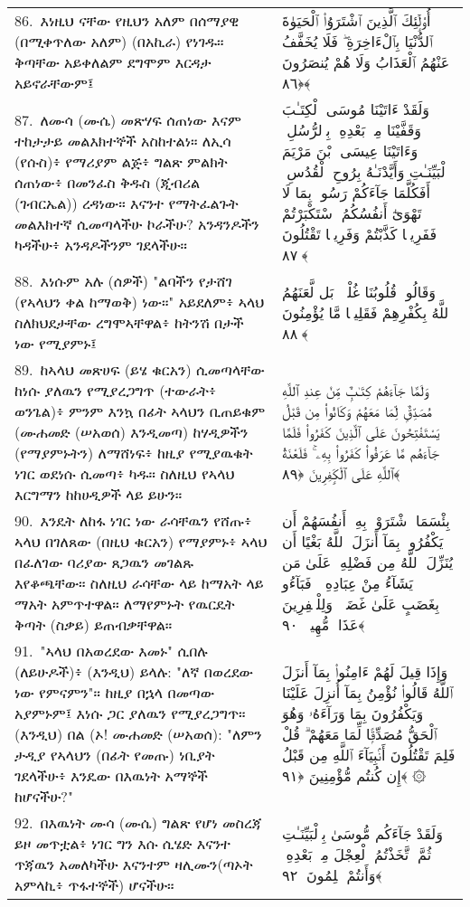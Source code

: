\documentclass[11pt,a4paper,oneside]{article}%
\newcommand{\mytextarabic}[1]{\textarabic{ #1 \flushright}}
\begin{document}
\begin{longtable}{%
  @{}
    p{}
  @{~~~}
    p{}
    @{}
}
86.\ እነዚህ ናቸው የዚህን አለም በሰማያዊ (በሚቀጥለው አለም) (በአኪራ) የነገዱ። ቅጣቸው አይቀለልም ደግሞም እርዳታ አይኖራቸውም፤ &  \mytextarabic{أُو۟لَٟٓئِكَ ٱلَّذِينَ ٱشْتَرَوُا۟ ٱلْحَيَوٰةَ ٱلدُّنْيَا بِٱلْءَاخِرَةِ ۖ فَلَا يُخَفَّفُ عَنْهُمُ ٱلْعَذَابُ وَلَا هُمْ يُنصَرُونَ ﴿٨٦﴾}\\
87.\ ለሙሳ (ሙሴ) መጽሃፍ ሰጠነው እናም ተከታታይ መልእክተኞች አስከተልነ። ለኢሳ (የሱስ)፥ የማሪያም ልጅ፥ ግልጽ ምልክት ሰጠነው፥ በመንፈስ ቅዱስ (ጂብሪል (ገብርኤል)) ረዳነው። እናንተ የማትፈልጉት መልእክተኛ ሲመጣላችሁ ኮራችሁ? አንዳንዶችን ካዳችሁ፥ አንዳዶችንም ገደላችሁ። &  \mytextarabic{وَلَقَدْ ءَاتَيْنَا مُوسَى ٱلْكِتَـٰبَ وَقَفَّيْنَا مِنۢ بَعْدِهِۦ بِٱلرُّسُلِ ۖ وَءَاتَيْنَا عِيسَى ٱبْنَ مَرْيَمَ ٱلْبَيِّنَـٰتِ وَأَيَّدْنَـٰهُ بِرُوحِ ٱلْقُدُسِ ۗ أَفَكُلَّمَا جَآءَكُمْ رَسُولٌۢ بِمَا لَا تَهْوَىٰٓ أَنفُسُكُمُ ٱسْتَكْبَرْتُمْ فَفَرِيقًۭا كَذَّبْتُمْ وَفَرِيقًۭا تَقْتُلُونَ ﴿٨٧﴾}\\
88.\ እነሱም አሉ (ሰዎች) "ልባችን የታሸገ (የኣላህን ቀል ከማወቅ) ነው።" አይደለም፥ ኣላህ ስለክህደታቸው ረግሞኣቸዋል፥ ከትንሽ በታች ነው የሚያምኑ፤ &  \mytextarabic{وَقَالُوا۟ قُلُوبُنَا غُلْفٌۢ ۚ بَل لَّعَنَهُمُ ٱللَّهُ بِكُفْرِهِمْ فَقَلِيلًۭا مَّا يُؤْمِنُونَ ﴿٨٨﴾}\\
89.\ ከኣላህ መጽሀፍ (ይሄ ቁርአን) ሲመጣላቸው ከነሱ ያለዉን የሚያረጋግጥ (ተውራት፥ ወንጌል)፥ ምንም እንኳ በፊት ኣላህን ቢጠይቁም (ሙሐመድ (ሠአወሰ) እንዲመጣ) ከሃዲዎችን (የማያምኑትን) ለማሸነፍ፥ ከዚያ የሚያዉቁት ነገር ወደነሱ ሲመጣ፥ ካዱ። ስለዚህ የኣላህ እርግማን ከከሀዲዎች ላይ ይሁን። &  \mytextarabic{وَلَمَّا جَآءَهُمْ كِتَـٰبٌۭ مِّنْ عِندِ ٱللَّهِ مُصَدِّقٌۭ لِّمَا مَعَهُمْ وَكَانُوا۟ مِن قَبْلُ يَسْتَفْتِحُونَ عَلَى ٱلَّذِينَ كَفَرُوا۟ فَلَمَّا جَآءَهُم مَّا عَرَفُوا۟ كَفَرُوا۟ بِهِۦ ۚ فَلَعْنَةُ ٱللَّهِ عَلَى ٱلْكَٟفِرِينَ ﴿٨٩﴾}\\
90.\ እንዴት ለከፋ ነገር ነው ራሳቸዉን የሸጡ፥ ኣላህ በገለጸው (በዚህ ቁርአን) የማያምኑ፥ ኣላህ በፈለገው ባሪያው ጸጋዉን መገልጹ እየቆጫቸው። ስለዚህ ራሳቸው ላይ ከማአት ላይ ማአት አምጥተዋል። ለማየምኑት የዉርዴት ቅጣት (ስቃይ) ይጠብቃቸዋል። &  \mytextarabic{ بِئْسَمَا ٱشْتَرَوْا۟ بِهِۦٓ أَنفُسَهُمْ أَن يَكْفُرُوا۟ بِمَآ أَنزَلَ ٱللَّهُ بَغْيًا أَن يُنَزِّلَ ٱللَّهُ مِن فَضْلِهِۦ عَلَىٰ مَن يَشَآءُ مِنْ عِبَادِهِۦ ۖ فَبَآءُو بِغَضَبٍ عَلَىٰ غَضَبٍۢ ۚ وَلِلْكَٟفِرِينَ عَذَابٌۭ مُّهِينٌۭ ﴿٩٠﴾}\\
91.\ "ኣላህ በአወረደው እመኑ" ሲበሉ (ለይሁዶች)፥ (እንዲህ) ይላሉ: "ለኛ በወረደው ነው የምናምን"። ከዚያ በኋላ በመጣው አያምኑም፤ እነሱ ጋር ያለዉን የሚያረጋግጥ። (እንዲህ) በል (ኦ! ሙሐመድ (ሠአወሰ): "ለምን ታዲያ  የኣላህን (በፊት የመጡ) ነቢያት   ገደላችሁ፥ እንዴው በእዉነት አማኞች ከሆናችሁ?"  &  \mytextarabic{ وَإِذَا قِيلَ لَهُمْ ءَامِنُوا۟ بِمَآ أَنزَلَ ٱللَّهُ قَالُوا۟ نُؤْمِنُ بِمَآ أُنزِلَ عَلَيْنَا وَيَكْفُرُونَ بِمَا وَرَآءَهُۥ وَهُوَ ٱلْحَقُّ مُصَدِّقًۭا لِّمَا مَعَهُمْ ۗ قُلْ فَلِمَ تَقْتُلُونَ أَنۢبِيَآءَ ٱللَّهِ مِن قَبْلُ إِن كُنتُم مُّؤْمِنِينَ ﴿٩١﴾ ۞}\\
92.\ በእዉነት ሙሳ (ሙሴ) ግልጽ የሆነ መስረጃ ይዞ መጥቷል፥ ነገር ግን እሱ ሲሄድ እናንተ ጥጃዉን አመለካችሁ እናንተም ዛሊሙን(ጣኦት አምላኪ፥ ጥፋተኞች) ሆናችሁ። &  \mytextarabic{وَلَقَدْ جَآءَكُم مُّوسَىٰ بِٱلْبَيِّنَـٰتِ ثُمَّ ٱتَّخَذْتُمُ ٱلْعِجْلَ مِنۢ بَعْدِهِۦ وَأَنتُمْ ظَٟلِمُونَ ﴿٩٢﴾}\\

\end{longtable}
\end{document}
